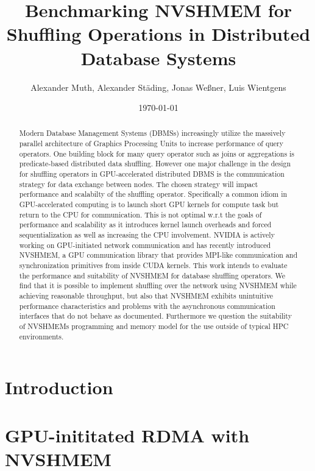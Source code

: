 \documentclass[
	english,
	ruledheaders=section,
	accentcolor=8c,
	type=intern,
	marginpar=false,
    logo=true,
	fontsize=10.5pt
	]{tudapub}
\begin{document}
\frontmatter

\title{Benchmarking NVSHMEM for Shuffling Operations in Distributed Database Systems}
\author{Alexander Muth, Alexander Städing, Jonas Weßner, Luis Wientgens}

\date{\today}
\maketitle

\mainmatter

\begin{abstract}
    Modern Database Management Systems (DBMSs) increasingly utilize the massively parallel architecture of Graphics Processing Units to increase performance of query operators. One building block for many query operator such as joins or aggregations is predicate-based distributed data shuffling. However one major challenge in the design for shuffling operators in GPU-accelerated distributed DBMS is the communication strategy for data exchange between nodes. The chosen strategy will impact performance and scalabilty of the shuffling operator. Specifically a common idiom in GPU-accelerated computing is to launch short GPU kernels for compute task but return to the CPU for communication. This is not optimal w.r.t the goals of performance and scalability as it introduces kernel launch overheads and forced sequentialization as well as increasing the CPU involvement. NVIDIA is actively working on GPU-initiated network communication and has recently introduced NVSHMEM, a GPU communication library that provides MPI-like communication and synchronization primitives from inside CUDA kernels. This work intends to evaluate the performance and suitability of NVSHMEM for database shuffling operators. We find that it is possible to implement shuffling over the network using NVSHMEM while achieving reasonable throughput, but also that NVSHMEM exhibits unintuitive performance characteristics and problems with the asynchronous communication interfaces that do not behave as documented. Furthermore we question the suitability of NVSHMEMs programming and memory model for the use outside of typical HPC environments.
\end{abstract}

\section{Introduction}\label{sec:intro}


\section{GPU-inititated RDMA with NVSHMEM}\label{sec:gpuinitiated}

\end{document}
